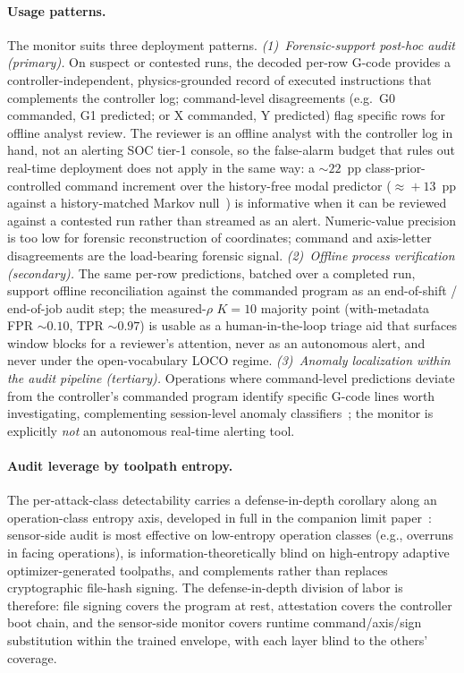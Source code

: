 \documentclass[sensors,article,submit,moreauthors,pdftex]{Definitions/mdpi}
\begin{document}
\paragraph{Usage patterns.} The monitor suits three deployment patterns. \emph{(1)~Forensic-support post-hoc audit (primary).} On suspect or contested runs, the decoded per-row G-code provides a controller-independent, physics-grounded record of executed instructions that complements the controller log; command-level disagreements (e.g.\ G0 commanded, G1 predicted; or X commanded, Y predicted) flag specific rows for offline analyst review. The reviewer is an offline analyst with the controller log in hand, not an alerting SOC tier-1 console, so the false-alarm budget that rules out real-time deployment does not apply in the same way: a $\sim$$22$~pp class-prior-controlled command increment over the history-free modal predictor ($\approx\!+13$~pp against a history-matched Markov null~\cite{decoder_paper}) is informative when it can be reviewed against a contested run rather than streamed as an alert. Numeric-value precision is too low for forensic reconstruction of coordinates; command and axis-letter disagreements are the load-bearing forensic signal. \emph{(2)~Offline process verification (secondary).} The same per-row predictions, batched over a completed run, support offline reconciliation against the commanded program as an end-of-shift / end-of-job audit step; the measured-$\rho$ $K\!=\!10$ majority point (with-metadata FPR $\sim 0.10$, TPR $\sim 0.97$) is usable as a human-in-the-loop triage aid that surfaces window blocks for a reviewer's attention, never as an autonomous alert, and never under the open-vocabulary LOCO regime. \emph{(3)~Anomaly localization within the audit pipeline (tertiary).} Operations where command-level predictions deviate from the controller's commanded program identify specific G-code lines worth investigating, complementing session-level anomaly classifiers~\cite{coelho2024anomaly,kimmell2025cnc}; the monitor is explicitly \emph{not} an autonomous real-time alerting tool.

\paragraph{Audit leverage by toolpath entropy.} The per-attack-class detectability carries a defense-in-depth corollary along an operation-class entropy axis, developed in full in the companion limit paper~\cite{paperB_entropy}: sensor-side audit is most effective on low-entropy operation classes (e.g., overruns in facing operations), is information-theoretically blind on high-entropy adaptive optimizer-generated toolpaths, and complements rather than replaces cryptographic file-hash signing. The defense-in-depth division of labor is therefore: file signing covers the program at rest, attestation covers the controller boot chain, and the sensor-side monitor covers runtime command/axis/sign substitution within the trained envelope, with each layer blind to the others' coverage.
\end{document}
